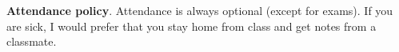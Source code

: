 \documentclass[12pt]{article}
\begin{document}

\bigskip

\noindent \textbf{Attendance policy}. Attendance is always optional (except for exams).
If you are sick, I would prefer that you stay home from class and get notes from a classmate.




\end{document}
